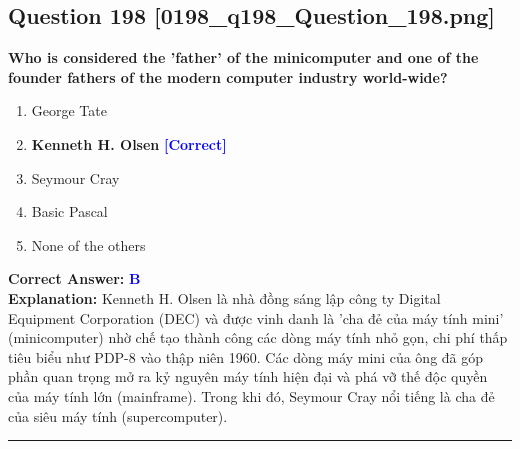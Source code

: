 \documentclass[11pt,a4paper]{article}
\begin{document}
\begin{minipage}{\textwidth}
\subsection*{Question 198 \quad \footnotesize{[0198\_q198\_Question\_198.png]}}
\noindent \textbf{Who is considered the 'father' of the minicomputer and one of the founder fathers of the modern computer industry world-wide?}

\begin{enumerate}[label=\Alph*.]
    \item George Tate
    \item \textbf{Kenneth H. Olsen} \hfill \textcolor{blue}{\textbf{[Correct]}}
    \item Seymour Cray
    \item Basic Pascal
    \item None of the others
\end{enumerate}

\noindent \textbf{Correct Answer:} \textcolor{blue}{\textbf{B}} \\[2pt]
\noindent \textbf{Explanation:} Kenneth H. Olsen là nhà đồng sáng lập công ty Digital Equipment Corporation (DEC) và được vinh danh là 'cha đẻ của máy tính mini' (minicomputer) nhờ chế tạo thành công các dòng máy tính nhỏ gọn, chi phí thấp tiêu biểu như PDP-8 vào thập niên 1960. Các dòng máy mini của ông đã góp phần quan trọng mở ra kỷ nguyên máy tính hiện đại và phá vỡ thế độc quyền của máy tính lớn (mainframe). Trong khi đó, Seymour Cray nổi tiếng là cha đẻ của siêu máy tính (supercomputer).

\par\vspace{0.3cm}
\hrule
\vspace{0.3cm}
\end{minipage}
\end{document}
